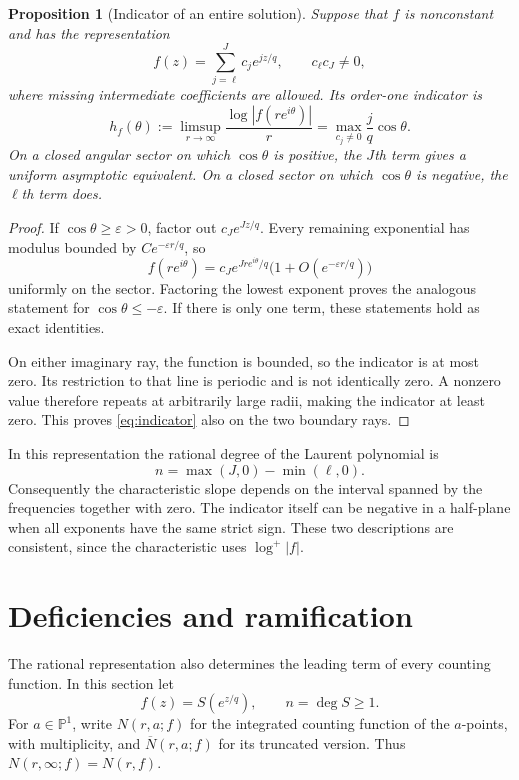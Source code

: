 \documentclass[11pt,reqno]{amsart}
\numberwithin{equation}{section}
\newtheorem{proposition}[theorem]{Proposition}
\theoremstyle{definition}
\theoremstyle{remark}
\newcommand{\PP}{\mathbb P}
\begin{document}
\begin{proposition}[Indicator of an entire solution]
\label{prop:indicator}
Suppose that $f$ is nonconstant and has the representation
\[
 f(z)=\sum_{j=\ell}^{J}c_j e^{jz/q},
 \qquad c_\ell c_J\ne0,
\]
where missing intermediate coefficients are allowed. Its order-one
indicator is
\begin{equation}
 h_f(\theta):=\limsup_{r\to\infty}
       \frac{\log|f(re^{i\theta})|}{r}
 =\max_{c_j\ne0}\frac{j}{q}\cos\theta.
 \label{eq:indicator}
\end{equation}
On a closed angular sector on which $\cos\theta$ is positive,
the $J$th term gives a uniform asymptotic equivalent. On a closed
sector on which $\cos\theta$ is negative, the $\ell$th term does.
\end{proposition}

\begin{proof}
If $\cos\theta\geq\varepsilon>0$, factor out
$c_J e^{Jz/q}$. Every remaining exponential has modulus bounded
by $C e^{-\varepsilon r/q}$, so
\[
 f(re^{i\theta})=c_J e^{Jre^{i\theta}/q}
 \bigl(1+O(e^{-\varepsilon r/q})\bigr)
\]
uniformly on the sector. Factoring the lowest exponent proves
the analogous statement for $\cos\theta\leq-\varepsilon$.
If there is only one term, these statements hold as exact
identities.

On either imaginary ray, the function is bounded, so the indicator
is at most zero. Its restriction to that line is periodic and is
not identically zero. A nonzero value therefore repeats at
arbitrarily large radii, making the indicator at least zero.
This proves \eqref{eq:indicator} also on the two boundary rays.
\end{proof}

In this representation the rational degree of the Laurent
polynomial is
\[
 n=\max(J,0)-\min(\ell,0).
\]
Consequently the characteristic slope depends on the interval
spanned by the frequencies together with zero. The indicator
itself can be negative in a half-plane when all exponents have
the same strict sign. These two descriptions are consistent,
since the characteristic uses $\log^+|f|$.

\section{Deficiencies and ramification}
\label{sec:deficiencies}

The rational representation also determines the leading term of
every counting function. In this section let
\[
 f(z)=S(e^{z/q}),\qquad n=\deg S\geq1.
\]
For $a\in\PP^1$, write $N(r,a;f)$ for the integrated counting
function of the $a$-points, with multiplicity, and
$\overline N(r,a;f)$ for its truncated version. Thus
$N(r,\infty;f)=N(r,f)$.
\end{document}
